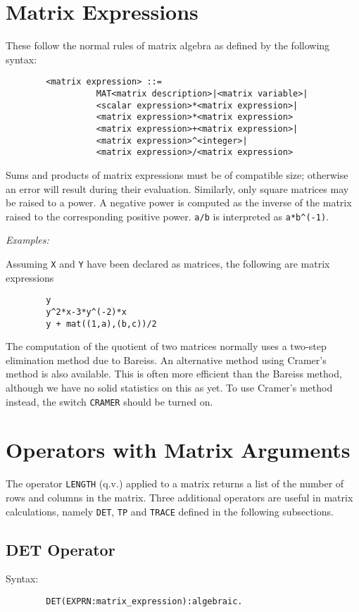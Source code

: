 \section{Matrix Expressions}

These follow the normal rules of matrix algebra as defined by the
following syntax: 
\begin{verbatim}
        <matrix expression> ::=
                  MAT<matrix description>|<matrix variable>|
                  <scalar expression>*<matrix expression>|
                  <matrix expression>*<matrix expression>
                  <matrix expression>+<matrix expression>|
                  <matrix expression>^<integer>|
                  <matrix expression>/<matrix expression>
\end{verbatim}
Sums and products of matrix expressions must be of compatible size;
otherwise an error will result during their evaluation.  Similarly, only
square matrices may be raised to a power.  A negative power is computed as
the inverse of the matrix raised to the corresponding positive power.
{\tt a/b} is interpreted as {\tt a*b\^{ }(-1)}.

{\it Examples:}

Assuming {\tt X} and {\tt Y} have been declared as matrices, the following
are matrix expressions
\begin{verbatim}
        y
        y^2*x-3*y^(-2)*x
        y + mat((1,a),(b,c))/2
\end{verbatim}
The computation of the quotient of two matrices normally uses a two-step
elimination method due to Bareiss. An alternative method using Cramer's
method is also available. This is often more efficient than the Bareiss
method, although we have no solid statistics on this as yet. To use Cramer's
method instead, the switch {\tt CRAMER} should be turned on.


\section{Operators with Matrix Arguments}

The operator {\tt LENGTH} (q.v.)  applied to a matrix
returns a list of the number of rows and columns in the matrix.  Three
additional operators are useful in matrix calculations, namely {\tt DET},
{\tt TP} and {\tt TRACE} defined in the following subsections.

\subsection{DET Operator} 
Syntax:
\begin{verbatim}
        DET(EXPRN:matrix_expression):algebraic.
\end{verbatim}

